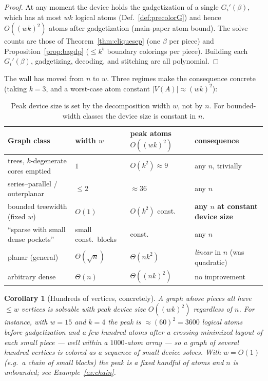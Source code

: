 \documentclass[11pt]{article}
\newtheorem{corollary}[theorem]{Corollary}
\theoremstyle{definition}
\theoremstyle{remark}
\begin{document}
\begin{proof}
At any moment the device holds the gadgetization of a single $G_i'(\beta)$, which
has at most $wk$ logical atoms (Def.~\ref{def:precolorG}) and hence $O((wk)^2)$
atoms after gadgetization (main-paper atom bound). The solve counts are those of
Theorem~\ref{thm:cliquesep} (one $\beta$ per piece) and
Proposition~\ref{prop:bagdp} ($\le k^{b}$ boundary colorings per piece). Building
each $G_i'(\beta)$, gadgetizing, decoding, and stitching are all polynomial.
\end{proof}

The wall has moved from $n$ to $w$. Three regimes make the consequence concrete
(taking $k=3$, and a worst-case atom constant $|V(A)|\approx (wk)^2$):

\begin{table}[h]
\centering
\begin{tabular}{@{}lll l@{}}
\toprule
Graph class & width $w$ & peak atoms $O((wk)^2)$ & consequence \\
\midrule
trees, $k$-degenerate cores emptied & $1$ & $O(k^2)\approx 9$ & any $n$, trivially \\
series--parallel / outerplanar & $\le 2$ & $\approx 36$ & any $n$ \\
bounded treewidth (fixed $w$) & $O(1)$ & $O(k^2)$ const. & \textbf{any $n$ at constant device size} \\
``sparse with small dense pockets'' & small const.\ blocks & const. & any $n$ \\
planar (general) & $\Theta(\sqrt n)$ & $\Theta(n k^2)$ & \emph{linear} in $n$ (was quadratic) \\
arbitrary dense & $\Theta(n)$ & $\Theta((nk)^2)$ & no improvement \\
\bottomrule
\end{tabular}
\caption{Peak device size is set by the decomposition width $w$, not by $n$. For
bounded-width classes the device size is constant in $n$.}
\label{tab:regimes}
\end{table}

\begin{corollary}[Hundreds of vertices, concretely]
\label{cor:hundreds}
A graph whose pieces all have $\le w$ vertices is solvable with peak device size
$O((wk)^2)$ regardless of $n$. For instance, with $w=15$ and $k=4$ the peak is
$\approx (60)^2 = 3600$ logical atoms before gadgetization and a few hundred atoms
after a crossing-minimized layout of each small piece --- well within a
$1000$-atom array --- so a graph of \emph{several hundred} vertices is colored as a
sequence of small device solves. With $w=O(1)$ (e.g.\ a chain of small blocks) the
peak is a fixed handful of atoms and $n$ is unbounded; see
Example~\ref{ex:chain}.
\end{corollary}
\end{document}
